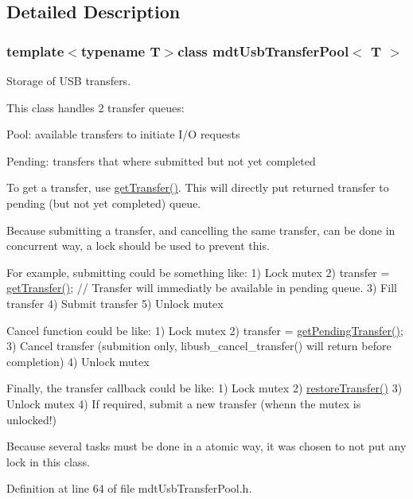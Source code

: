 \subsection{Detailed Description}
\subsubsection*{template$<$typename T$>$class mdt\-Usb\-Transfer\-Pool$<$ T $>$}

Storage of U\-S\-B transfers. 

This class handles 2 transfer queues\-:
\begin{DoxyItemize}
\item Pool\-: available transfers to initiate I/\-O requests
\item Pending\-: transfers that where submitted but not yet completed
\end{DoxyItemize}

To get a transfer, use \hyperlink{classmdt_usb_transfer_pool_a941436df0356fce84f8706169e3f3c81}{get\-Transfer()}. This will directly put returned transfer to pending (but not yet completed) queue.

Because submitting a transfer, and cancelling the same transfer, can be done in concurrent way, a lock should be used to prevent this.

For example, submitting could be something like\-: 1) Lock mutex 2) transfer = \hyperlink{classmdt_usb_transfer_pool_a941436df0356fce84f8706169e3f3c81}{get\-Transfer()}; // Transfer will immediatly be available in pending queue. 3) Fill transfer 4) Submit transfer 5) Unlock mutex

Cancel function could be like\-: 1) Lock mutex 2) transfer = \hyperlink{classmdt_usb_transfer_pool_a5cdb802491240b96ce3211f7c202df47}{get\-Pending\-Transfer()}; 3) Cancel transfer (submition only, libusb\-\_\-cancel\-\_\-transfer() will return before completion) 4) Unlock mutex

Finally, the transfer callback could be like\-: 1) Lock mutex 2) \hyperlink{classmdt_usb_transfer_pool_afc3e25bd7fee70de2aaf819e0dc8e2d1}{restore\-Transfer()} 3) Unlock mutex 4) If required, submit a new transfer (whenn the mutex is unlocked!)

Because several tasks must be done in a atomic way, it was chosen to not put any lock in this class. 

Definition at line 64 of file mdt\-Usb\-Transfer\-Pool.\-h.



